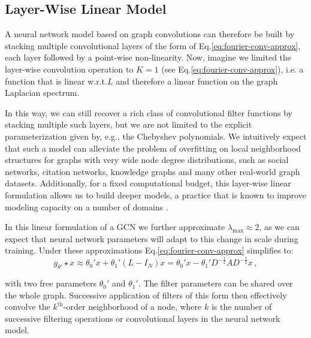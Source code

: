 \documentclass{article} %
\makeatletter
\newcommand*{\eg}{e.g.\@\xspace}
\newcommand*{\ie}{i.e.\@\xspace}
\newcommand*{\wrt}{w.r.t.\@\xspace}
\newcommand*{\eq}{Eq.\@\xspace}
\makeatother
\begin{document}
\subsection{Layer-Wise Linear Model}
\label{sec:linear-model}
A neural network model based on graph convolutions can therefore be built by stacking multiple convolutional layers of the form of \eq \ref{eq:fourier-conv-approx}, each layer followed by a point-wise non-linearity. Now, imagine we limited the layer-wise convolution operation to $K=1$ (see \eq \ref{eq:fourier-conv-approx}), \ie a function that is linear \wrt $L$ and therefore a linear function on the graph Laplacian spectrum.

In this way, we can still recover a rich class of convolutional filter functions by stacking multiple such layers, but we are not limited to the explicit parameterization given by, \eg, the Chebyshev polynomials. We intuitively expect that such a model can alleviate the problem of overfitting on local neighborhood structures for graphs with very wide node degree distributions, such as social networks, citation networks, knowledge graphs and many other real-world graph datasets. Additionally, for a fixed computational budget, this layer-wise linear formulation allows us to build deeper models, a practice that is known to improve modeling capacity on a number of domains \citep{he2015deep}.

In this linear formulation of a GCN we further approximate $\lambda_{\text{max}}\approx 2$, as we can expect that neural network parameters will adapt to this change in scale during training. Under these approximations \eq \ref{eq:fourier-conv-approx} simplifies to:
\begin{equation}
  g_{\theta'} \star x \approx  \theta_0' x
  + \theta_1' \left(L-I_N\right)x = \theta_0' x - \theta_1' D^{-\frac{1}{2}}AD^{-\frac{1}{2}} x \, ,
\label{eq:fourier-conv-approx2}
\end{equation}

with two free parameters $\theta_0'$ and $\theta_1'$. The filter parameters can be shared over the whole graph. Successive application of filters of this form then effectively convolve the $k^{\text{th}}$-order neighborhood of a node, where $k$ is the number of successive filtering operations or convolutional layers in the neural network model.
\end{document}
